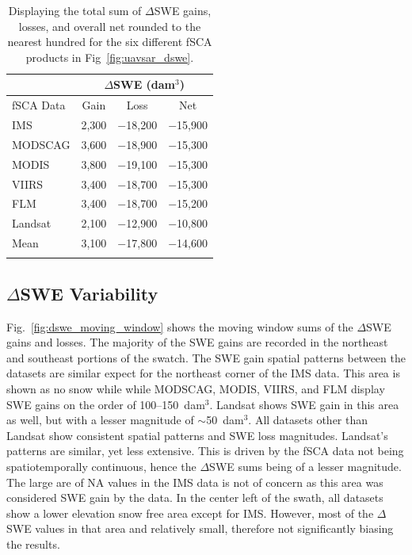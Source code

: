 \begin{table}
\centering
\caption{Displaying the total sum of $\Delta$SWE gains, losses, and overall net rounded to the nearest hundred for the six different fSCA products in Fig~\ref{fig:uavsar_dswe}.}
\begin{tabular}{lccc}
\toprule
& \multicolumn{3}{c}{$\Delta$SWE (dam$^{3}$)} \\
\midrule
fSCA Data & Gain & Loss & Net \\
\midrule
IMS & 2,300 & $-$18,200 & $-$15,900 \\
MODSCAG & 3,600 & $-$18,900 & $-$15,300 \\
MODIS & 3,800 & $-$19,100 & $-$15,300 \\
VIIRS & 3,400 & $-$18,700 & $-$15,300 \\
FLM & 3,400 & $-$18,700 & $-$15,200 \\
Landsat & 2,100 & $-$12,900 & $-$10,800 \\
\midrule
Mean & 3,100 & $-$17,800 & $-$14,600 \\
\bottomrule
\label{tab:dswe_stats}
\end{tabular}
\end{table}



\hypertarget{ch4-results}{\subsection{$\Delta$SWE Variability}\label{ch4-results}}

Fig.~\ref{fig:dswe_moving_window} shows the moving window sums of the $\Delta$SWE gains and losses. The majority of the SWE gains are recorded in the northeast and southeast portions of the swatch. The SWE gain spatial patterns between the datasets are similar expect for the northeast corner of the IMS data. This area is shown as no snow while while MODSCAG, MODIS, VIIRS, and FLM display SWE gains on the order of 100--150~dam$^{3}$. Landsat shows SWE gain in this area as well, but with a lesser magnitude of $\sim$50~dam$^{3}$. All datasets other than Landsat show consistent spatial patterns and SWE loss magnitudes. Landsat's patterns are similar, yet less extensive. This is driven by the fSCA data not being spatiotemporally continuous, hence the $\Delta$SWE sums being of a lesser magnitude. The large are of NA values in the IMS data is not of concern as this area was considered SWE gain by the data. In the center left of the swath, all datasets show a lower elevation snow free area except for IMS. However, most of the $\Delta$SWE values in that area and relatively small, therefore not significantly biasing the results.

